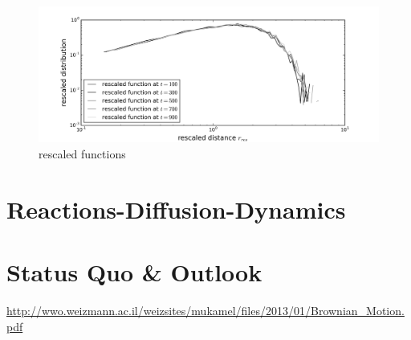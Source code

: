 \documentclass[
  a4paper,BCOR10mm,oneside,
  bibtotoc,idxtotoc,
  headsepline,footsepline,%
  fleqn,openbib
]{scrbook}
\begin{document}
\begin{figure}[h]
\includegraphics[width=\textwidth]{./data/rescaled.png}
\caption{rescaled functions}
 \centering
\end{figure}



\chapter{Reactions-Diffusion-Dynamics}
\chapter{Status Quo \& Outlook}
%

\nocite{}



\url{http://wwo.weizmann.ac.il/weizsites/mukamel/files/2013/01/Brownian_Motion.pdf}
\end{document}
